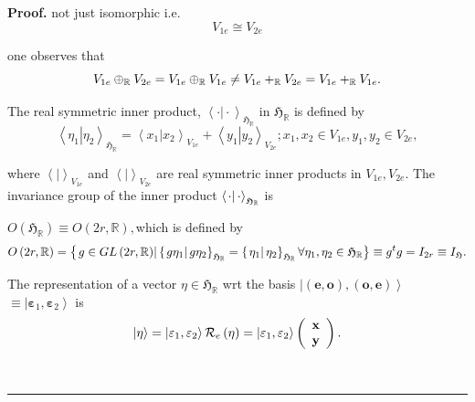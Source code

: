 \documentclass[aps,preprint]{revtex4}
\newenvironment{proof}[1][Proof]{\noindent\textbf{#1.} }{\ \rule{0.5em}{0.5em}}
\begin{document}
\begin{proof}
not just isomorphic i.e. 
\begin{equation}
V_{1e}\cong V_{2e}
\end{equation}

one observes that 
\begin{equation}
V_{1e}\oplus_{\mathbb{R}}V_{2e}=V_{1e}\oplus_{\mathbb{R}}V_{1e}\neq V_{1e}+_{%
\mathbb{R}}V_{2e}=V_{1e}+_{\mathbb{R}}V_{1e}.
\end{equation}

The real symmetric inner product, $\left\langle \left. \cdot\right\vert
\cdot\right\rangle _{\mathfrak{H}_{\mathbb{R}}}$ in $\mathfrak{H}_{\mathbb{R}%
}$ is defined by 
\begin{equation}
\left\langle \left. \eta_{1}\right\vert \eta_{2}\right\rangle _{\mathfrak{H}%
_{\mathbb{R}}}=\left\langle \left. x_{1}\right\vert x_{2}\right\rangle
_{V_{1e}}+\left\langle \left. y_{1}\right\vert y_{2}\right\rangle
_{V_{2e}};x_{1},x_{2}\in V_{1e},y_{1},y_{2}\in V_{2e},
\end{equation}

where $\left\langle \left. {}\right\vert \right\rangle _{V_{1e}}$ and $%
\left\langle \left. {}\right\vert \right\rangle _{V_{2e}}$ are real
symmetric inner products in $V_{1e},V_{2e}$. The invariance group of the
inner product $\left\langle \left. \cdot \right\vert \cdot \right\rangle _{%
\mathfrak{H}_{\mathbb{R}}}$ is

$O\left( \mathfrak{H}_{\mathbb{R}}\right) \equiv O\left( 2r,\mathbb{R}%
\right) ,$which is defined by 
\begin{equation}
O\left( 2r,\mathbb{R}\right) =\left\{ \left. g\in GL\left( 2r,\mathbb{R}%
\right) \right\vert \left\{ \left. g\eta_{1}\right\vert g\eta_{2}\right\} _{%
\mathfrak{H}_{\mathbb{R}}}=\left\{ \left. \eta_{1}\right\vert \eta
_{2}\right\} _{\mathfrak{H}_{\mathbb{R}}}\forall\eta_{1},\eta_{2}\in%
\mathfrak{H}_{\mathbb{R}}\right\} \equiv g^{t}g=I_{2r}\equiv I_{\mathfrak{H}%
}.
\end{equation}

The representation of a vector $\eta \in \mathfrak{H}_{\mathbb{R}}$ wrt the
basis $\left\vert \left( \mathbf{e},\mathbf{o}\right) ,\left( \mathbf{o},%
\mathbf{e}\right) \right\rangle $ $\equiv \left\vert \mathbf{\varepsilon }%
_{1},\mathbf{\varepsilon }_{2}\right\rangle $ is 
\begin{equation}
\left\vert \eta \right\rangle =\left\vert \mathbf{\varepsilon }_{1},\mathbf{%
\varepsilon }_{2}\right\rangle \mathcal{R}_{e}\left( \eta \right)
=\left\vert \mathbf{\varepsilon }_{1},\mathbf{\varepsilon }_{2}\right\rangle
\left( 
\begin{array}{c}
\mathbf{x} \\ 
\mathbf{y}%
\end{array}%
\right) .
\end{equation}


\end{proof}
\end{document}
